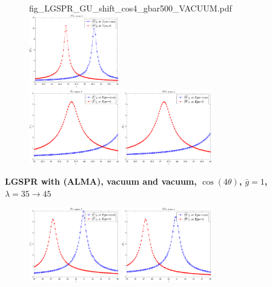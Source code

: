 \documentclass[11pt]{article}
\begin{document}
\begin{figure}[H]
{		{fig_LGSPR_GU_shift_cos4_gbar500_VACUUM.pdf}}
	\quad
	\subfigure 
	{\includegraphics[width=0.35\textwidth]
		{fig_LGSPR_GW_shift_cos4_gbar500_VACUUM.pdf}}
	\\
	\subfigure 
	{\includegraphics[width=0.35\textwidth]
		{fig_LGSPR_GU_shift_cos4_gbar1000_VACUUM.pdf}}
	\quad
	\subfigure 
	{\includegraphics[width=0.35\textwidth]
		{fig_LGSPR_GW_shift_cos4_gbar1000_VACUUM.pdf}}
\end{figure}

\noindent\textbf{\large LGSPR  with (ALMA), vacuum and vacuum, $\cos(4\theta)$, $\bar{g}=1$, $\lambda=35 \to 45$}
\begin{figure}[H]
	\centering
	\subfigure 
	{\includegraphics[width=0.35\textwidth]
		{fig_LGSPR_GU_shift_cos4_gbar1000_VACUUM_45.pdf}}
	\quad
	\subfigure 
	{\includegraphics[width=0.35\textwidth]
		{fig_LGSPR_GW_shift_cos4_gbar1000_VACUUM_45.pdf}}
\end{figure}
\end{document}
